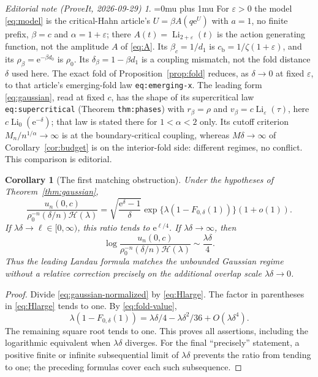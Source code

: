 \documentclass[11pt,a4paper]{article}
\numberwithin{equation}{section}
\newtheorem{corollary}[theorem]{Corollary}
\theoremstyle{definition}
\theoremstyle{remark}
\newtheorem*{ednoteinner}{Editorial note (ProveIt, 2026-09-29)}
\newenvironment{ednote}{\begin{ednoteinner}\sloppy\Urlmuskip=0mu plus 1mu\relax}{\end{ednoteinner}}
\DeclareMathOperator{\Li}{Li}
\newcommand{\ep}{\varepsilon}\newcommand{\la}{\lambda}
\newcommand{\rhob}{\rho_0}\newcommand{\ee}{\mathrm e}
\newcommand{\HH}{\mathcal H}\newcommand{\RR}{\mathcal R}
\begin{document}
\begin{ednote}
For \(\ep>0\) the model \eqref{eq:model} is the critical-Hahn article's
\(U=\beta A(q\ee^U)\) \cite{repo-critical} with \(a=1\), no finite prefix,
\(\beta=c\) and \(\alpha=1+\ep\); there \(A(t)=\Li_{2+\ep}(t)\) is the
action generating function, not the amplitude \(A\) of \eqref{eq:A}. Its
\(\beta_c=1/d_1\) is \(c_{\mathrm b}=1/\zeta(1+\ep)\), and its
\(\rho_\beta=\ee^{-\beta d_0}\) is \(\rhob\). Its
\(\delta_\beta=1-\beta d_1\) is a coupling mismatch, not the fold distance
\(\delta\) used here. The exact fold of Proposition~\ref{prop:fold}
reduces, as \(\delta\to0\) at fixed \(\ep\), to that article's
emerging-fold law \texttt{eq:emerging-x}. The leading form
\eqref{eq:gaussian}, read at fixed \(c\), has the shape of its
supercritical law \texttt{eq:supercritical} (Theorem \texttt{thm:phases})
with \(r_\beta=\rho\) and \(v_\beta=c\Li_\ep(\tau)\), here
\(c\Li_0(\ee^{-\delta})\); that law is stated there for \(1<\alpha<2\)
only. Its cutoff criterion
\(M_n/n^{1/\alpha}\to\infty\) is at the boundary-critical coupling, whereas
\(M\delta\to\infty\) of Corollary~\ref{cor:budget} is on the interior-fold
side: different regimes, no conflict. This comparison is editorial.
\end{ednote}

\begin{corollary}[The first matching obstruction]\label{cor:matching}
Under the hypotheses of Theorem~\ref{thm:gaussian},
\begin{equation}\label{eq:matching-ratio}
 \frac{u_n(0,c)}{\rhob^{-n}(\delta/n)\HH(\la)}
 =\sqrt{\frac{\ee^\delta-1}{\delta}}
   \exp\{\la(1-F_{0,\delta}(1))\}(1+o(1)).
\end{equation}
If \(\la\delta\to\ell\in[0,\infty)\), this ratio tends to
\(\ee^{\ell/4}\). If \(\la\delta\to\infty\), then
\begin{equation}\label{eq:matching-log}
 \log\frac{u_n(0,c)}{\rhob^{-n}(\delta/n)\HH(\la)}
                     \sim\frac{\la\delta}{4}.
\end{equation}
Thus the leading Landau formula matches the unbounded Gaussian regime
without a relative correction precisely on the additional overlap scale
\(\la\delta\to0\).
\end{corollary}
\begin{proof}
Divide \eqref{eq:gaussian-normalized} by \eqref{eq:Hlarge}. The factor
in parentheses in \eqref{eq:Hlarge} tends to one. By
\eqref{eq:fold-value},
\[
 \la(1-F_{0,\delta}(1))
 =\la\delta/4-\la\delta^2/36+O(\la\delta^4).
\]
The remaining square root tends to one. This proves all assertions,
including the logarithmic equivalent when \(\la\delta\) diverges.
For the final ``precisely'' statement, a positive finite or infinite
subsequential limit of \(\la\delta\) prevents the ratio from tending
to one; the preceding formulas cover each such subsequence.
\end{proof}
\end{document}
